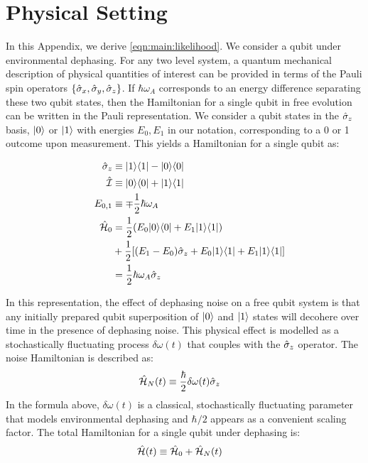 

\section{Physical Setting \label{sec:app:setup_1}}

In this Appendix, we derive \cref{eqn:main:likelihood}. We consider a qubit under environmental dephasing.  For any two level system, a quantum mechanical description of physical quantities of interest can be provided in terms of the Pauli spin operators $\{ \hat{\sigma}_{x}, \hat{\sigma}_{y}, \hat{\sigma}_{z}\}$. If $\hbar \omega_A$ corresponds to an energy difference separating these two qubit states, then the Hamiltonian for a single qubit in free evolution can be written in the Pauli representation. We consider a qubit states in the $\hat{\sigma}_{z}$ basis, $| 0 \rangle$ or $| 1 \rangle$ with energies $E_0, E_1$ in our notation, corresponding to a 0 or 1 outcome upon measurement. This yields a Hamiltonian for a single qubit as:

\begin{align}
\hat{\sigma}_{z} &\equiv | 1 \rangle\langle 1 | - | 0 \rangle\langle 0 | \\
\hat{\mathcal{I}} & \equiv | 0 \rangle\langle 0 | + | 1 \rangle\langle 1 | \\
\quad E_{0,1} &\equiv \mp \frac{1}{2} \hbar \omega_A \\
\hat{\mathcal{H}}_0 & = \frac{1}{2} (E_0| 0 \rangle\langle 0 |+ E_1| 1 \rangle\langle 1 |) \\
& + \frac{1}{2} [(E_1 - E_0)\hat{\sigma}_{z} + E_0 | 1 \rangle\langle 1 | + E_1 | 1 \rangle\langle 1 |]\\
 &= \frac{1}{2} \hbar \omega_A \hat{\sigma}_{z}
\end{align}

In this representation, the effect of dephasing noise on a free qubit system is that any initially prepared qubit superposition of $| 0 \rangle$ and $| 1 \rangle$ states will decohere over time in the presence of dephasing noise. This physical effect is modelled as a stochastically fluctuating process $\delta\omega(t)$ that couples with the $\hat{\sigma}_{z}$ operator. The noise Hamiltonian is described as:
\begin{align} 
\hat{\mathcal{H}}_{N}(t) & \equiv \frac{\hbar}{2}\delta\omega(t)\hat{\sigma}_{z}
\end{align}
In the formula above, $\delta\omega(t)$ is a classical, stochastically fluctuating parameter that models environmental dephasing and $\hbar/2$ appears as a convenient scaling factor. The total Hamiltonian for a single qubit under dephasing is:
\begin{align} 
\hat{\mathcal{H}}(t) &\equiv \hat{\mathcal{H}}_0 + \hat{\mathcal{H}}_{N}(t)
\end{align}


